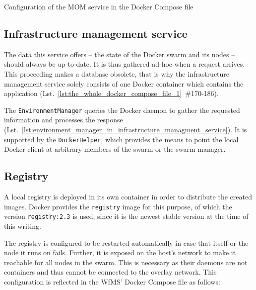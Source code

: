       \begin{listing}[!htbp]
        \inputminted[firstline=23,lastline=33,fontsize=\footnotesize,linenos=true,numberblanklines=true,showspaces=false,breaklines=true,baselinestretch=1]{yaml}{../code/wfms.yml}
        \caption{Configuration of the \ac{MOM} service in the Docker Compose file}
        \label{lst:configuration_of_the_mom_service_in_the_docker_compose_file}
      \end{listing}

  \subsection{Infrastructure management service} %
    \label{sub:infrastructure_management_service}
      The data this service offers -- the state of the Docker swarm and its nodes -- should always be up-to-date. It is thus gathered ad-hoc when a request arrives. This proceeding makes a database obsolete, that is why the infrastructure management service solely consists of one Docker container which contains the application (Lst.~\ref{lst:the_whole_docker_compose_file_1}~\#170-186).

      The \texttt{EnvironmentManager} queries the Docker daemon to gather the requested information and processes the response (Lst.~\ref{lst:environment_manager_in_infrastructure_managment_service}). It is supported by the \texttt{DockerHelper}, which provides the means to point the local Docker client at arbitrary members of the swarm or the swarm manager.

  \subsection{Registry} %
    \label{sub:registry}
    A local registry is deployed in its own container in order to distribute the created images.
    Docker provides the \texttt{registry} image for this purpose, of which the version \texttt{registry:2.3} is used, since it is the newest stable version at the time of this writing.

    The registry is configured to be restarted automatically in case that itself or the node it runs on fails. Further, it is exposed on the host's network to make it reachable for all nodes in the swarm. This is necessary as their daemons are not containers and thus cannot be connected to the overlay network. This configuration is reflected in the \ac{WfMS}' Docker Compose file as follows:


